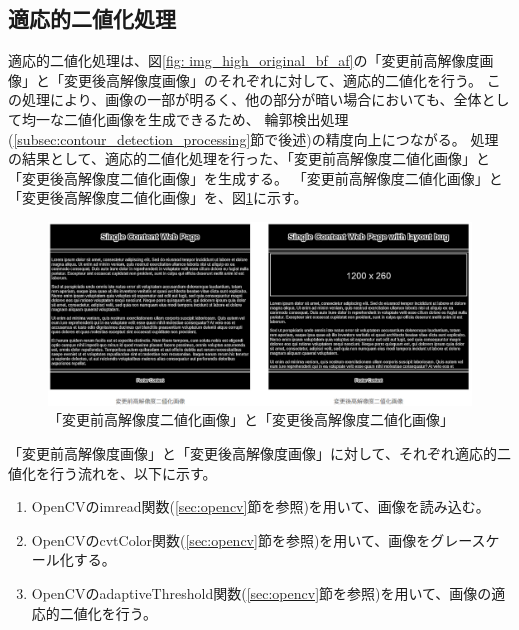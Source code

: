 \subsection{適応的二値化処理}\label{subsec:Adaptive_Binarisation}
適応的二値化処理は、図\ref{fig: img_high_original_bf_af}の「変更前高解像度画像」と「変更後高解像度画像」のそれぞれに対して、適応的二値化を行う。
この処理により、画像の一部が明るく、他の部分が暗い場合においても、全体として均一な二値化画像を生成できるため、
輪郭検出処理(\ref{subsec:contour_detection_processing}節で後述)の精度向上につながる。
処理の結果として、適応的二値化処理を行った、「変更前高解像度二値化画像」と「変更後高解像度二値化画像」を生成する。
「変更前高解像度二値化画像」と「変更後高解像度二値化画像」を、図\ref{fig: img_high_bin_bf_af}に示す。
\begin{figure}[tp]
    \begin{center}
        \includegraphics[width=1.0\columnwidth]{image/4_img_high_bin_bf_af.png}
        \caption{「変更前高解像度二値化画像」と「変更後高解像度二値化画像」}
        \label{fig: img_high_bin_bf_af}
    \end{center}
\end{figure}
\par
「変更前高解像度画像」と「変更後高解像度画像」に対して、それぞれ適応的二値化を行う流れを、以下に示す。
\begin{enumerate}
    \item OpenCVのimread関数(\ref{sec:opencv}節を参照)を用いて、画像を読み込む。
    \item OpenCVのcvtColor関数(\ref{sec:opencv}節を参照)を用いて、画像をグレースケール化する。
    \item OpenCVのadaptiveThreshold関数(\ref{sec:opencv}節を参照)を用いて、画像の適応的二値化を行う。
\end{enumerate}

